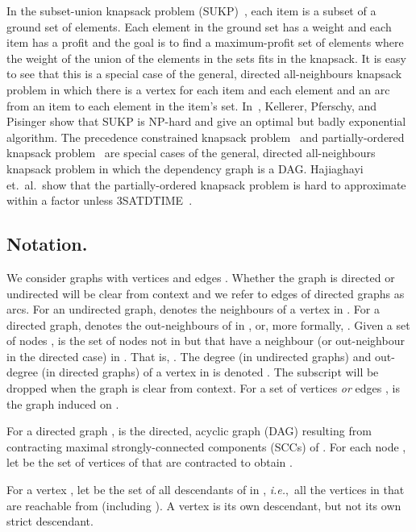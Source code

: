 \documentclass[12pt]{article}
\begin{document}
In the subset-union knapsack problem (SUKP)~\cite{KPP}, each item is a subset
of a ground set of elements.  Each element in the ground set has a
weight and each item has a profit and the goal is to find a
maximum-profit set of elements where the weight of the union of the
elements in the sets fits in the knapsack.  It is easy to see that
this is a special case of the general, directed all-neighbours
knapsack problem in which there is a vertex for each item and each
element and an arc from an item to each element in the item's set.
In~\cite{KPP}, Kellerer, Pferschy, and Pisinger show that SUKP is
NP-hard and give an optimal but badly exponential algorithm.  The
precedence constrained knapsack problem~\cite{BFFS05} and
partially-ordered knapsack problem~\cite{Kolliopoulos:2007p1242} are
special cases of the general, directed all-neighbours knapsack problem
in which the dependency graph is a DAG.  Hajiaghayi et.~al.~show that
the partially-ordered knapsack problem is hard to approximate within a
 factor unless
3SATDTIME~\cite{Hajiaghayi:2006p1244}.









\subsection{Notation.}

We consider graphs  with  vertices  and  edges .
Whether the graph is directed or undirected will be clear from
context and we refer to edges of directed graphs as arcs.
For an undirected graph,  denotes the neighbours of a vertex  in
.  For a directed graph,  denotes the out-neighbours of 
in , or, more formally, .  Given a set of nodes ,  is the set of nodes not in  but that have a neighbour (or out-neighbour in the directed case) in .  That is, .
The degree (in undirected graphs) and out-degree (in directed graphs) of a vertex 
in  is denoted .  The subscript  will be dropped
when the graph is clear from context.  For a set of vertices {\em or}
edges ,  is the graph induced on .

For a directed graph ,  is the directed, acyclic graph (DAG)
resulting from contracting maximal strongly-connected components
(SCCs) of .  For each node , let  be the set of
vertices of  that are contracted to obtain .


For a vertex ,
let  be the set of all descendants of  in , {\em i.e.},~all
the vertices in  that are reachable from  (including ).  A
vertex is its own descendant, but not its own
strict descendant.
\end{document}
